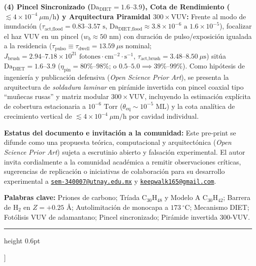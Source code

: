 \documentclass[10pt,twocolumn,a4paper]{article}
\begin{document}
\begin{@twocolumnfalse}
{    \noindent\textbf{(4) Pincel Sincronizado ($\text{Da}_{\text{DIET}} = 1.6\text{--}3.9$), Cota de Rendimiento ($\lesssim 4 \times 10^{-4}\ \mu\text{m/h}$) y Arquitectura Piramidal $300\times\text{VUV}$:} Frente al modo de inundación ($\tau_{\text{act,flood}} = 0.83\text{--}3.57\text{ s}$, $\text{Da}_{\text{DIET,flood}} \approx 3.8 \times 10^{-6}\text{ a }1.6 \times 10^{-5}$), focalizar el haz VUV en un pincel ($w_b \approx 50\text{ nm}$) con duración de pulso/exposición igualada a la residencia ($\tau_{\text{pulso}} \equiv \tau_{\text{dwell}} = 13.59\ \mu\text{s}$ nominal; $J_{\text{brush}} = 2.94\text{--}7.18 \times 10^{21}\text{ fotones}\cdot\text{cm}^{-2}\cdot\text{s}^{-1}$, $\tau_{\text{act,brush}} = 3.48\text{--}8.50\ \mu\text{s}$) sitúa $\text{Da}_{\text{DIET}} = 1.6\text{--}3.9$ ($\eta_{\text{pin}} = 80\%\text{--}98\%$; o $0.5\text{--}5.0 \implies 39\%\text{--}99\%$). Como hipótesis de ingeniería y publicación defensiva (\textit{Open Science Prior Art}), se presenta la arquitectura de \textit{soldadura laminar} en pirámide invertida con pincel coaxial tipo ``muñecas rusas'' y matriz modular $300\times\text{VUV}$, incluyendo la estimación explícita de cobertura estacionaria a $10^{-6}\text{ Torr}$ ($\theta_{\text{eq}} \sim 10^{-5}\text{ ML}$) y la cota analítica de crecimiento vertical de $\lesssim 4 \times 10^{-4}\ \mu\text{m/h}$ por cavidad individual.

    \vspace{0.25em}
    \noindent\textbf{Estatus del documento e invitación a la comunidad:} Este pre-print se difunde como una propuesta teórica, computacional y arquitectónica (\textit{Open Science Prior Art}) sujeta a escrutinio abierto y falsación experimental. El autor invita cordialmente a la comunidad académica a remitir observaciones críticas, sugerencias de replicación o iniciativas de colaboración para su desarrollo experimental a \href{mailto:sem-340007@utnay.edu.mx}{\texttt{sem-340007@utnay.edu.mx}} y \href{mailto:keepwalk165@gmail.com}{\texttt{keepwalk165@gmail.com}}.

    \vspace{0.30em}
    \noindent\textbf{Palabras clave:} Priones de carbono; Tríada $\text{C}_{30}\text{H}_{48}$ y Modelo A $\text{C}_{30}\text{H}_{42}$; Barrera de $\text{H}_2$ en $Z=+0.25\text{ \AA}$; Autolimitación de monocapa a $173\ ^\circ\text{C}$; Mecanismo DIET; Fotólisis VUV de adamantano; Pincel sincronizado; Pirámide invertida 300-VUV.
    }
    \vspace{0.35em}
    \hrule height 0.6pt
    \vspace{0.65em}
  \end{@twocolumnfalse}
]
\end{document}
